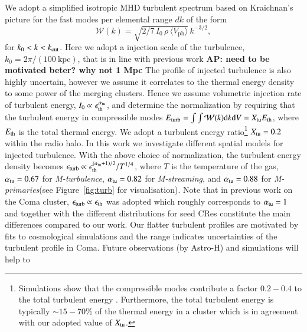 \documentclass[a4paper,fleqn,usenatbib]{mnras}
\newcommand{\Mstream}{{\it M-streaming}\xspace}
\newcommand{\Mflatturb}{{\it M-turbulence}\xspace}
\newcommand{\Mprimary}{{\it M-primaries}\xspace}
\newcommand{\Vph}{V_\mathrm{ph}}
\def\AP#1{{\bf  AP: #1}}
\begin{document}
We adopt a simplified isotropic MHD turbulent spectrum based on
Kraichnan's picture for the fast modes per elemental range $dk$ of the
form
\begin{equation}
  \label{eq:Wk}
  \mathcal{W}(k) =
\sqrt{2/7\,I_0\,\rho\,\langle \Vph \rangle}\,k^{-3/2},
\end{equation}
for $k_0<k<k_{\mathrm{cut}}$. Here we adopt a injection scale of the
turbulence, $k_0= 2\pi/(100~\mbox{kpc})$, that is in line with
previous work \citep{brunetti07,brunetti11} \AP{need to be motivated
  beter? why not 1 Mpc}
The profile of injected turbulence is also highly uncertain, however
we assume it correlates to the thermal energy density to some power of
the merging clusters. Hence we assume volumetric injection rate of
turbulent energy, $I_0\propto \epsilon_{\mathrm{th}}^{\alpha_{\mathrm{tu}}}$,
and determine the normalization by requiring that the turbulent energy
in compressible modes $E_{\mathrm{turb}}=\int \int \mathcal{W}(k) {\mathrm{d}}k
{\mathrm{d}}V = X_{\mathrm{tu}} E_{\mathrm{th}}$, where $E_{\mathrm{th}}$ is the total
thermal energy. We adopt a turbulent energy ratio\footnote{Simulations
  show that the compressible modes contribute a factor $0.2-0.4$ to
  the total turbulent energy
  \citep{2013ApJ...771..131B,2015ApJ...800...60M}. Furthermore, the
  total turbulent energy is typically $\sim15-70$\% of the thermal
  energy in a cluster \cite{2011A&A...529A..17V} which is in agreement
  with our adopted value of $X_{\mathrm{tu}}$.}  $X_{\mathrm{tu}}=0.2$ within
the radio halo. In this work we investigate different spatial models
for injected turbulence. With the above choice of normalization, the
turbulent energy density becomes $\epsilon_{\mathrm{turb}} \propto
\epsilon_{\mathrm{th}}^{(\alpha_{\mathrm{tu}}+1)/2}/T^{1/4}$, where $T$ is the
temperature of the gas, $\alpha_{\mathrm{tu}}= 0.67$ for \Mflatturb,
$\alpha_{\mathrm{tu}}= 0.82$ for \Mstream, and $\alpha_{\mathrm{tu}}= 0.88$ for
\Mprimary (see Figure~\ref{fig:turb} for visualisation). Note that in
previous work on the Coma cluster, $\epsilon_{\mathrm{turb}} \propto
\epsilon_{\mathrm{th}}$ was adopted which roughly corresponds to
$\alpha_{\mathrm{tu}}= 1$ \citep{brunetti12} and together with the
different distributions for seed CRes constitute the main differences
compared to our work. Our flatter turbulent profiles are motivated by
fits to cosmological simulations
\citep{2009ApJ...705.1129L,2010ApJ...725.1452S,2011A&A...529A..17V,2012ApJ...758...74B}
and the range indicates uncertainties of the turbulent profile in
Coma. Future observations (by Astro-H) and simulations will help to
\end{document}
